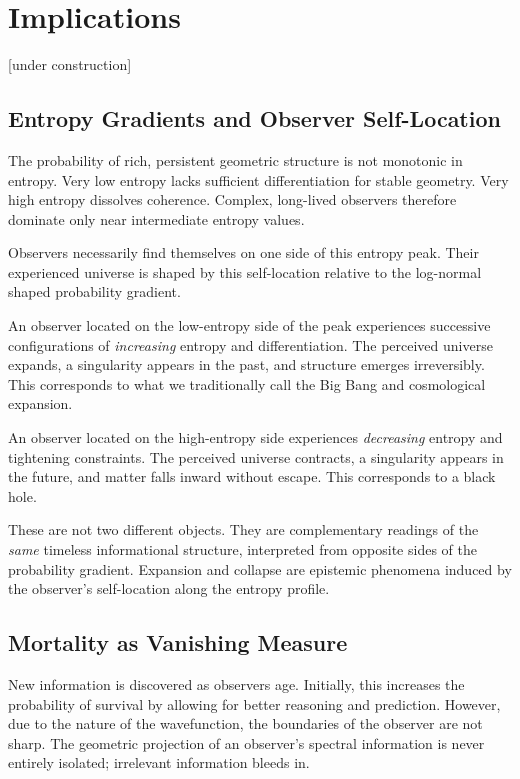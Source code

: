 \chapter{Implications}
\label{chap:implications}

[under construction]

\section{Entropy Gradients and Observer Self-Location}

The probability of rich, persistent geometric structure is not monotonic in entropy. Very low entropy lacks sufficient differentiation for stable geometry. Very high entropy dissolves coherence. Complex, long-lived observers therefore dominate only near intermediate entropy values.

Observers necessarily find themselves on one side of this entropy peak. Their experienced universe is shaped by this self-location relative to the log-normal shaped probability gradient.

An observer located on the low-entropy side of the peak experiences successive configurations of \emph{increasing} entropy and differentiation.
The perceived universe expands, a singularity appears in the past, and structure emerges irreversibly. This corresponds to what we traditionally call the Big Bang and cosmological expansion.

An observer located on the high-entropy side experiences \emph{decreasing} entropy and tightening constraints.
The perceived universe contracts, a singularity appears in the future, and matter falls inward without escape.
This corresponds to a black hole.

These are not two different objects. They are complementary readings of the \emph{same} timeless informational structure,
interpreted from opposite sides of the probability gradient.
Expansion and collapse are epistemic phenomena induced by the observer’s self-location along the entropy profile.


\section{Mortality as Vanishing Measure}

New information is discovered as observers age.
Initially, this increases the probability of survival by allowing for better reasoning and prediction.
However, due to the nature of the wavefunction, the boundaries of the observer are not sharp.
The geometric projection of an observer's spectral information is never entirely isolated; irrelevant information bleeds in.

